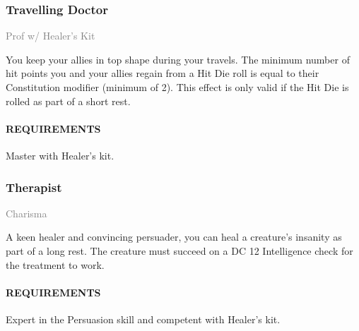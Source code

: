     \subsubsection{Travelling Doctor} \label{feat::travellingdoctor}
    \small{\textcolor{gray}{Prof w/ Healer's Kit}}

    \normalsize
    You keep your allies in top shape during your travels.
    The minimum number of hit points you and your allies regain from a Hit Die roll is equal to their Constitution modifier (minimum of 2).
    This effect is only valid if the Hit Die is rolled as part of a short rest.
    \paragraph{REQUIREMENTS} Master with Healer's kit.

    \subsubsection{Therapist} \label{feat::therapist}
    \small{\textcolor{gray}{Charisma}}

    \normalsize
    A keen healer and convincing persuader, you can heal a creature's insanity as part of a long rest.
    The creature must succeed on a DC 12 Intelligence check for the treatment to work.
    \paragraph{REQUIREMENTS} Expert in the Persuasion skill and competent with Healer's kit.



